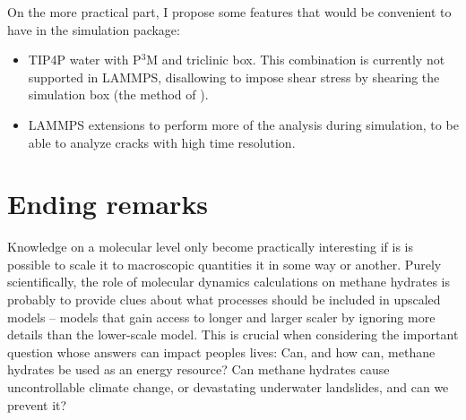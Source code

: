 On the more practical part, I propose some features that would be convenient to have in the simulation package:
\begin{itemize}
\item TIP4P water with P$^3$M and triclinic box. This combination is currently not supported in LAMMPS, disallowing to impose shear stress by shearing the simulation box (the method of \citet{Parrinello1981}).
\item LAMMPS extensions to perform more of the analysis during simulation, to be able to analyze cracks with high time resolution.
\end{itemize}
 
\section{Ending remarks}
Knowledge on a molecular level only become practically interesting if is is possible to scale it to macroscopic quantities it in some way or another. Purely scientifically, the role of molecular dynamics calculations on methane hydrates is probably to provide clues about what processes should be included in upscaled models -- models that gain access to longer and larger scaler by ignoring more details than the lower-scale model. This is crucial when considering the important question whose answers can impact peoples lives: Can, and how can, methane hydrates be used as an energy resource? Can methane hydrates cause uncontrollable climate change, or devastating underwater landslides, and can we prevent it? 